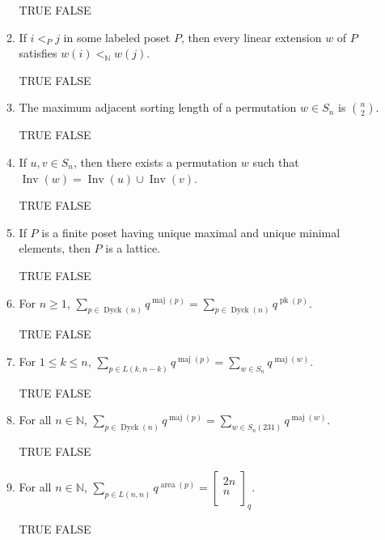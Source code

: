 \documentclass[11pt]{article}
\theoremstyle{definition}
\newcommand{\ds}{\displaystyle}
\DeclareMathOperator{\Inv}{Inv}
\DeclareMathOperator{\pk}{pk}
\DeclareMathOperator{\Dyck}{Dyck}
\DeclareMathOperator{\maj}{maj}
\DeclareMathOperator{\area}{area}
\newcommand{\qbinom}[2]{
  \displaystyle \left[\begin{matrix}#1  \\#2  \\ \end{matrix}\right]}
\begin{document}
\begin{enumerate}
\begin{enumerate}
\smallskip

TRUE \qquad FALSE

\item If $i<_P j$ in some labeled poset $P$, then every linear extension $w$ of $P$ satisfies $w(i) <_{\mathbb{N}} w(j)$.

\smallskip

TRUE \qquad FALSE

\item The maximum adjacent sorting length of a permutation $w\in S_n$ is $\ds \binom{n}{2}$.

\smallskip

TRUE \qquad FALSE

\item If $u,v\in S_n$, then there exists a permutation $w$ such that $\Inv(w)=\Inv(u)\cup \Inv(v)$.

\smallskip

TRUE \qquad FALSE

\item If $P$ is a finite poset having unique maximal and unique minimal elements, then $P$ is a lattice.

\smallskip

TRUE \qquad FALSE

\item For $n\geq 1$, $\displaystyle \sum_{p\in\Dyck(n)} q^{\maj(p)} =\sum_{p\in\Dyck(n)}q^{\pk(p)}$. 

\smallskip

TRUE \qquad FALSE

\item For $1\leq k\leq n$, $\displaystyle \sum_{p\in L(k,n-k)}q^{\maj(p)}=\sum_{w\in S_n}q^{\maj(w)}$.

\smallskip

TRUE \qquad FALSE

\item For all $n\in\mathbb{N}$, $\displaystyle \sum_{p\in\Dyck(n)}q^{\maj(p)}=\sum_{w\in S_n(231)}q^{\maj(w)}$.

\smallskip

TRUE \qquad FALSE

\item For all $n\in\mathbb{N}$, $\displaystyle \sum_{p\in L(n,n)} q^{\area(p)} =\qbinom{2n}{n}_q$. 

\smallskip

TRUE \qquad FALSE

%
%


\end{enumerate}
\end{enumerate}
\end{document}
